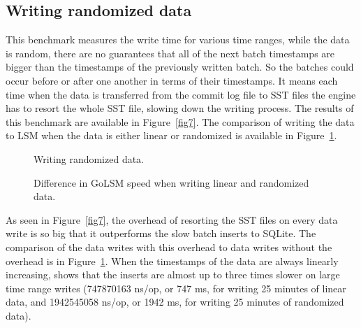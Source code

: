 \subsection{Writing randomized data}

This benchmark measures the write time for various time ranges, while the data is random, there are no guarantees that all of the next batch timestamps are bigger than the timestamps of the previously written batch. So the batches could occur before or after one another in terms of their timestamps. It means each time when the data is transferred from the commit log file to SST files the engine has to resort the whole SST file, slowing down the writing process. The results of this benchmark are available in Figure~\ref{fig7}. The comparison of writing the data to LSM when the data is either linear or randomized is available in Figure~\ref{fig8}.

\begin{figure}[!htb]
	\begin{minipage}{0.48\textwidth}
		\centering
		\resizebox{\textwidth}{!}{%
			
		}
		\caption{Writing randomized data.}\label{fig7}
	\end{minipage}\hfill
	\begin{minipage}{0.48\textwidth}
		\centering
		\resizebox{\textwidth}{!}{%
			
		}
		\caption{Difference in GoLSM speed when writing linear and randomized data.}\label{fig8}
	\end{minipage}
\end{figure}

As seen in Figure~\ref{fig7}, the overhead of resorting the SST files on every data write is so big that it outperforms the slow batch inserts to SQLite. The comparison of the data writes with this overhead to data writes without the overhead is in Figure~\ref{fig8}. When the timestamps of the data are always linearly increasing, shows that the inserts are almost up to three times slower on large time range writes (747870163 ns/op, or 747 ms, for writing 25 minutes of linear data, and 1942545058 ns/op, or 1942 ms, for writing 25 minutes of randomized data).